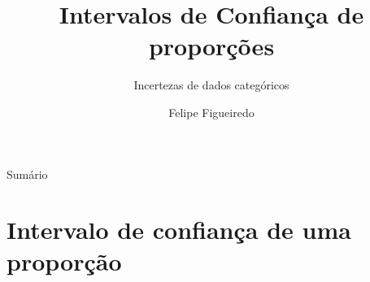 \documentclass{beamer}
\title%
{Intervalos de Confiança de proporções}
\subtitle
{Incertezas de dados categóricos} %
\author%
{Felipe Figueiredo}%
\institute[] %
{
}
\date%
{}
\begin{document}
\begin{frame}
  \titlepage
\end{frame}

\begin{frame}{Sumário}
  \tableofcontents
\end{frame}








\section{Intervalo de confiança de uma proporção}
\end{document}
